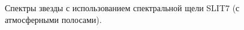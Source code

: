 \documentclass[a4paper]{article}
\begin{document}
\hfill\break
\begin{figure}[h]
\begin{minipage}[h]{0.50\linewidth}
\end{minipage}
\begin{minipage}[h]{0.50\linewidth}
\end{minipage}
\begin{minipage}[h]{0.50\linewidth}
\end{minipage}
\begin{minipage}[h]{0.50\linewidth}
\end{minipage}
\caption{Спектры звезды с использованием спектральной щели SLIT7 (с атмосферными полосами).}
\label{ris:image3}
\end{figure}
\end{document}
